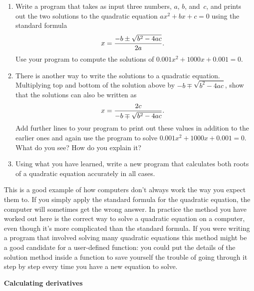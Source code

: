 \documentclass[12pt]{article}
\begin{document}
\begin{exercises}
\begin{enumerate}
\item Write a program that takes as input three numbers, $a$, $b$,
  and~$c$, and prints out the two solutions to the quadratic equation
  $ax^2+bx+c=0$ using the standard formula
\begin{displaymath}
x = {-b \pm \sqrt{b^2-4ac}\over2a}.
\end{displaymath}
Use your program to compute the solutions of $0.001 x^2 + 1000 x + 0.001 =
0$.
\item There is another way to write the solutions to a quadratic equation.
  Multiplying top and bottom of the solution above by
  $-b\mp\sqrt{b^2-4ac}$, show that the solutions can also be written as
\begin{displaymath}
x = {2c\over-b\mp\sqrt{b^2-4ac}}.
\end{displaymath}
Add further lines to your program to print out these values in addition to
the earlier ones and again use the program to solve $0.001 x^2 + 1000 x +
0.001 = 0$.  What do you see?  How do you explain it?
\item Using what you have learned, write a new program that calculates both
  roots of a quadratic equation accurately in all cases.
\end{enumerate}
This is a good example of how computers don't always work the way you
expect them to.  If you simply apply the standard formula for the quadratic
equation, the computer will sometimes get the wrong answer.  In practice
the method you have worked out here is the correct way to solve a quadratic
equation on a computer, even though it's more complicated than the standard
formula.  If you were writing a program that involved solving many
quadratic equations this method might be a good candidate for a
user-defined function: you could put the details of the solution method
inside a function to save yourself the trouble of going through it step by
step every time you have a new equation to solve.



\newpage
\exercise \textbf{Calculating derivatives}


\end{exercises}
\end{document}
